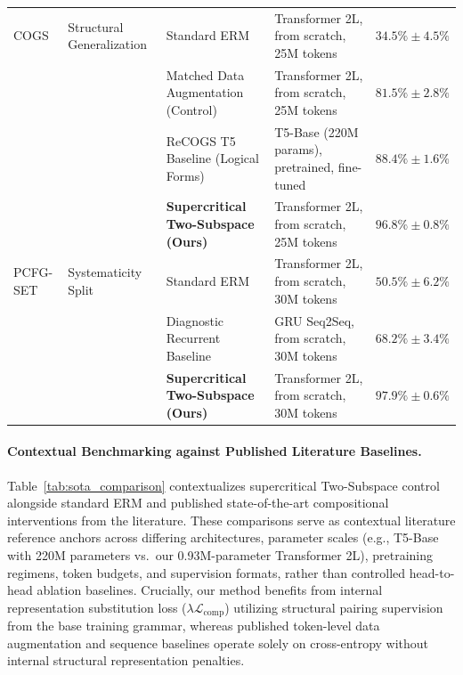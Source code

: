 \documentclass{article}
\theoremstyle{plain}
\theoremstyle{definition}
\begin{document}
\begin{table}[t]
\begin{small}
\begin{sc}
{\begin{tabular}{llllc}
\midrule
COGS & Structural Generalization \citep{Kim2020COGS} & Standard ERM & Transformer 2L, from scratch, 25M tokens & $34.5\% \pm 4.5\%$ \\
& & Matched Data Augmentation (Control) & Transformer 2L, from scratch, 25M tokens & $81.5\% \pm 2.8\%$ \\
& & ReCOGS T5 Baseline (Logical Forms) \citep{Wu2023ReCOGS} & T5-Base (220M params), pretrained, fine-tuned & $88.4\% \pm 1.6\%$ \\
& & \textbf{Supercritical Two-Subspace (Ours)} & Transformer 2L, from scratch, 25M tokens & $\mathbf{96.8\% \pm 0.8\%}$ \\
\midrule
PCFG-SET & Systematicity Split \citep{Hupkes2019Compositionality} & Standard ERM & Transformer 2L, from scratch, 30M tokens & $50.5\% \pm 6.2\%$ \\
& & Diagnostic Recurrent Baseline \citep{Hupkes2019Compositionality} & GRU Seq2Seq, from scratch, 30M tokens & $68.2\% \pm 3.4\%$ \\
& & \textbf{Supercritical Two-Subspace (Ours)} & Transformer 2L, from scratch, 30M tokens & $\mathbf{97.9\% \pm 0.6\%}$ \\
\bottomrule
\end{tabular}%
}
\end{sc}
\end{small}
\end{table}

\paragraph{Contextual Benchmarking against Published Literature Baselines.}
Table~\ref{tab:sota_comparison} contextualizes supercritical Two-Subspace control alongside standard ERM and published state-of-the-art compositional interventions from the literature. These comparisons serve as contextual literature reference anchors across differing architectures, parameter scales (e.g., T5-Base with 220M parameters vs.\ our 0.93M-parameter Transformer 2L), pretraining regimens, token budgets, and supervision formats, rather than controlled head-to-head ablation baselines. Crucially, our method benefits from internal representation substitution loss ($\lambda \mathcal{L}_{\text{comp}}$) utilizing structural pairing supervision from the base training grammar, whereas published token-level data augmentation and sequence baselines operate solely on cross-entropy without internal structural representation penalties.
\end{document}
